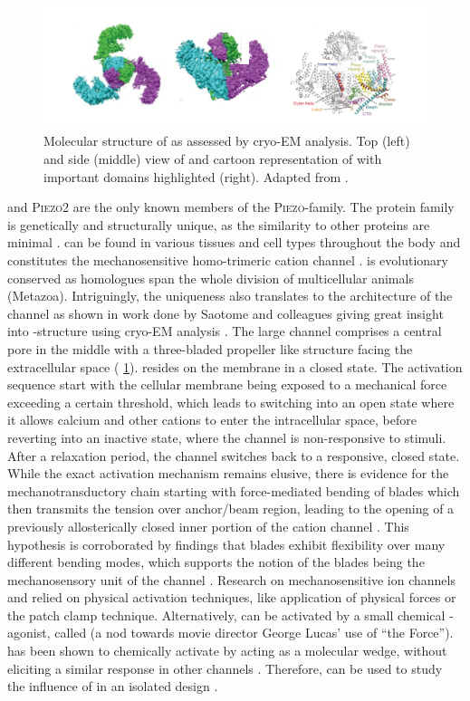 \begin{figure}
	\centering
	\includegraphics[width=0.6\linewidth]{PiezoMolecule.png}
	\caption{Molecular structure of \Piezo{} as assessed by cryo-EM analysis. Top (left) and side (middle) view of \Piezo{} and cartoon representation of \Piezo{} with important domains highlighted (right). Adapted from \cite{Saotome2018, Zhao2018}.}
	\label{pic:Piezo}
\end{figure}

\Piezo{} and \textsc{Piezo2} are the only known members of the \textsc{Piezo}-family. 
The protein family is genetically and structurally unique, as the similarity to other proteins are minimal \cite{Coste2010}. 
\Piezo{} can be found in various tissues and cell types throughout the body and constitutes the mechanosensitive homo-trimeric cation channel \Piezo{} \cite{Zhao2018}. \Piezo{} is evolutionary conserved as homologues span the whole division of multicellular animals (Metazoa). Intriguingly, the uniqueness also translates to the architecture of the channel as shown in work done by Saotome and colleagues giving great insight into \Piezo{}-structure using cryo-EM analysis \cite{Saotome2018}. The large channel comprises a central pore in the middle with a three-bladed propeller like structure facing the extracellular space ( \ref{pic:Piezo}). \Piezo{} resides on the membrane in a closed state. The activation sequence start with the cellular membrane being exposed to a mechanical force exceeding a certain threshold, which leads to \Piezo{} switching into an open state where it allows calcium and other cations to enter the intracellular space, before reverting into an inactive state, where the channel is non-responsive to stimuli. After a relaxation period, the channel switches back to a responsive, closed state. While the exact activation mechanism remains elusive, there is evidence for the mechanotransductory chain starting with force-mediated bending of blades which then transmits the tension over anchor/beam region, leading to the opening of a previously allosterically closed inner portion of the cation channel \cite{Zhao2018}. This hypothesis is corroborated by findings that blades exhibit flexibility over many different bending modes, which supports the notion of the blades being the mechanosensory unit of the channel \cite{Ge2015}. 
Research on mechanosensitive ion channels and \Piezo{} relied on physical activation techniques, like application of physical forces or the patch clamp technique. Alternatively, \Piezo{} can be activated by a small chemical \Piezo{}-agonist, called \Yoda{} (a nod towards movie director George Lucas’ use of “the Force”). \Yoda{} has been shown to chemically activate \Piezo{} by acting as a molecular wedge, without eliciting a similar response in other channels \cite{Syeda2015, Lacroix2018}. Therefore, \Yoda{} can be used to study the influence of \Piezo{} in an isolated design \cite{Botello-Smith2019}.

